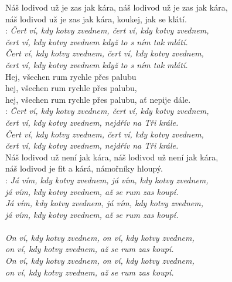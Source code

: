 
Náš lodivod už je zas jak kára, náš lodivod už je zas jak kára,\\
náš lodivod už je zas jak kára, koukej, jak se klátí.\\

\textregistered:
\emph{Čert ví, kdy kotvy zvednem, čert ví, kdy kotvy zvednem,\\
čert ví, kdy kotvy zvednem když to s ním tak mlátí.\\
Čert ví, kdy kotvy zvednem, čert ví, kdy kotvy zvednem,\\
čert ví, kdy kotvy zvednem když to s ním tak mlátí.}\\

Hej, všechen rum rychle přes palubu\\
hej, všechen rum rychle přes palubu,\\
hej, všechen rum rychle přes palubu, ať nepije dále.\\

\textregistered:
\emph{Čert ví, kdy kotvy zvednem, čert ví, kdy kotvy zvednem,\\
čert ví, kdy kotvy zvednem, nejdřív na Tři krále.\\
Čert ví, kdy kotvy zvednem, čert ví, kdy kotvy zvednem,\\
čert ví, kdy kotvy zvednem, nejdřív na Tři krále.}\\

Náš lodivod už není jak kára, náš lodivod už není jak kára,\\
náš lodivod je fit a kárá, námořníky hloupý.\\

\textregistered:
\emph{Já vím, kdy kotvy zvednem, já vím, kdy kotvy zvednem,\\
já vím, kdy kotvy zvednem, až se rum zas koupí.\\
Já vím, kdy kotvy zvednem, já vím, kdy kotvy zvednem,\\
já vím, kdy kotvy zvednem, až se rum zas koupí.\\
\\
On ví, kdy kotvy zvednem, on ví, kdy kotvy zvednem,\\
on ví, kdy kotvy zvednem, až se rum zas koupí.\\
On ví, kdy kotvy zvednem, on ví, kdy kotvy zvednem,\\
on ví, kdy kotvy zvednem, až se rum zas koupí.}

\newpage
